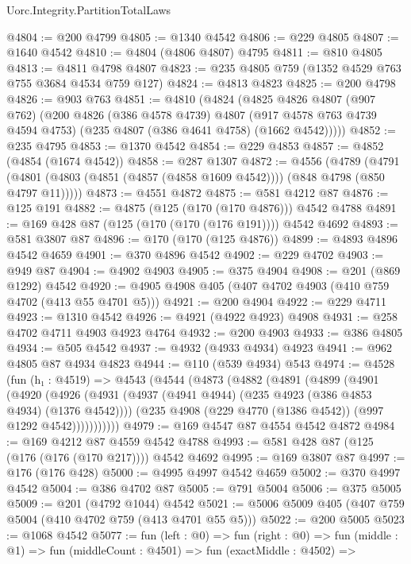 \begin{lexlean}{Uorc.Integrity.PartitionTotalLaws}
\begin{coremodule}
@4804 := @200 @4799
@4805 := @1340 @4542
@4806 := @229 @4805
@4807 := @1640 @4542
@4810 := @4804 (@4806 @4807) @4795
@4811 := @810 @4805
@4813 := @4811 @4798 @4807
@4823 := @235 @4805 @759 (@1352 @4529 @763 @755 @3684 @4534 @759 @127)
@4824 := @4813 @4823
@4825 := @200 @4798
@4826 := @903 @763
@4851 := @4810
    (@4824
      (@4825
        @4826
        @4807
        (@907 @762)
        (@200
          @4826
          (@386 @4578 @4739)
          @4807
          (@917 @4578 @763 @4739 @4594 @4753)
          (@235 @4807 (@386 @4641 @4758) (@1662 @4542)))))
@4852 := @235 @4795
@4853 := @1370 @4542
@4854 := @229 @4853
@4857 := @4852 (@4854 (@1674 @4542))
@4858 := @287 @1307
@4872 := @4556
    (@4789
      (@4791 (@4801 (@4803 (@4851 (@4857 (@4858 @1609 @4542)))) (@848 @4798 (@850 @4797 @11)))))
@4873 := @4551 @4872
@4875 := @581 @4212 @87
@4876 := @125 @191
@4882 := @4875 (@125 (@170 (@170 @4876))) @4542 @4788
@4891 := @169 @428 @87 (@125 (@170 (@170 (@176 @191)))) @4542 @4692
@4893 := @581 @3807 @87
@4896 := @170 (@170 (@125 @4876))
@4899 := @4893 @4896 @4542 @4659
@4901 := @370 @4896 @4542
@4902 := @229 @4702
@4903 := @949 @87
@4904 := @4902 @4903
@4905 := @375 @4904
@4908 := @201 (@869 @1292) @4542
@4920 := @4905 @4908 @405 (@407 @4702 @4903 (@410 @759 @4702 (@413 @55 @4701 @5)))
@4921 := @200 @4904
@4922 := @229 @4711
@4923 := @1310 @4542
@4926 := @4921 (@4922 @4923) @4908
@4931 := @258 @4702 @4711 @4903 @4923 @4764
@4932 := @200 @4903
@4933 := @386 @4805
@4934 := @505 @4542
@4937 := @4932 (@4933 @4934) @4923
@4941 := @962 @4805 @87 @4934 @4823
@4944 := @110 (@539 @4934) @543
@4974 := @4528
    (fun (h₁ : @4519) =>
    @4543
      (@4544
        (@4873
          (@4882
            (@4891
              (@4899
                (@4901
                  (@4920
                    (@4926
                      (@4931 (@4937 (@4941 @4944) (@235 @4923 (@386 @4853 @4934) (@1376 @4542))))
                      (@235 @4908 (@229 @4770 (@1386 @4542)) (@997 @1292 @4542)))))))))))
@4979 := @169 @4547 @87 @4554 @4542 @4872
@4984 := @169 @4212 @87 @4559 @4542 @4788
@4993 := @581 @428 @87 (@125 (@176 (@176 (@170 @217)))) @4542 @4692
@4995 := @169 @3807 @87
@4997 := @176 (@176 @428)
@5000 := @4995 @4997 @4542 @4659
@5002 := @370 @4997 @4542
@5004 := @386 @4702 @87
@5005 := @791 @5004
@5006 := @375 @5005
@5009 := @201 (@4792 @1044) @4542
@5021 := @5006 @5009 @405 (@407 @759 @5004 (@410 @4702 @759 (@413 @4701 @55 @5)))
@5022 := @200 @5005
@5023 := @1068 @4542
@5077 := fun (left : @0) =>
  fun (right : @0) =>
  fun (middle : @1) =>
  fun (middleCount : @4501) =>
  fun (exactMiddle : @4502) =>

\end{coremodule}
\end{lexlean}
